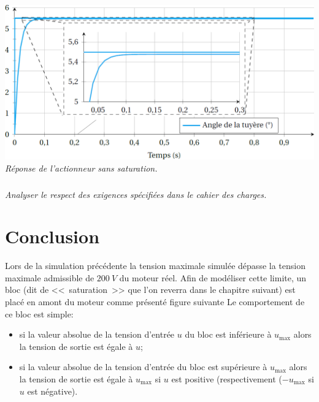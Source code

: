\documentclass[10pt,fleqn]{article} %
\begin{document}
\begin{multicols}{2}
\begin{center}
\includegraphics[width=.95\linewidth]{images/fig_09}
\textit{Réponse de l'actionneur sans saturation.}
\end{center}
%
%
%
%




\subparagraph{}\textit{ Analyser le respect des exigences spécifiées dans le cahier des charges.}





\section*{Conclusion}

Lors de la simulation précédente la tension maximale simulée dépasse la tension maximale admissible de $\SI{200}{V}$ du moteur réel. Afin de modéliser cette limite, un bloc (dit de <<~saturation~>> que l'on reverra dans le chapitre suivant) est placé en amont du moteur comme présenté figure suivante %
Le comportement de ce bloc est simple:
\begin{itemize}
\item si la valeur absolue de la tension d'entrée $u$ du bloc est inférieure à $u_{\text{max}}$ alors la tension de sortie est égale à $u$;
\item si la valeur absolue de la tension d'entrée du bloc est supérieure à $u_{\text{max}}$ alors la tension de sortie est égale à $u_{\text{max}}$ si $u$ est positive (respectivement ($-u_{\text{max}}$ si $u$ est négative).
\end{itemize}
 

\end{multicols}
\end{document}
